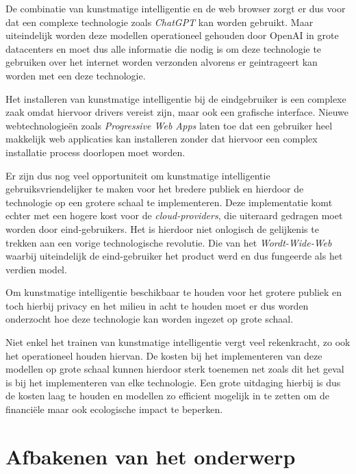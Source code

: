 \bigbreak{}

De combinatie van kunstmatige intelligentie en de web browser zorgt er dus voor dat een complexe technologie zoals \textit{ChatGPT} kan worden gebruikt. Maar uiteindelijk worden deze modellen operationeel gehouden door OpenAI in grote datacenters en moet dus alle informatie die nodig is om deze technologie te gebruiken over het internet worden verzonden alvorens er geintrageert kan worden met een deze technologie.

\bigbreak{}

Het installeren van kunstmatige intelligentie bij de eindgebruiker is een complexe zaak omdat hiervoor drivers vereist zijn, maar ook een grafische interface. Nieuwe webtechnologieën zoals \textit{Progressive Web Apps} laten toe dat een gebruiker heel makkelijk web applicaties kan installeren zonder dat hiervoor een complex installatie process doorlopen moet worden. 

\bigbreak{}

Er zijn dus nog veel opportuniteit om kunstmatige intelligentie gebruiksvriendelijker te maken voor het bredere publiek en hierdoor de technologie op een grotere schaal te implementeren. Deze implementatie komt echter met een hogere kost voor de \textit{cloud-providers}, die uiteraard gedragen moet worden door eind-gebruikers. Het is hierdoor niet onlogisch de gelijkenis te trekken aan een vorige technologische revolutie. Die van het \textit{Wordt-Wide-Web} waarbij uiteindelijk de eind-gebruiker het product werd en dus fungeerde als het verdien model.

\bigbreak{}

Om kunstmatige intelligentie beschikbaar te houden voor het grotere publiek en toch hierbij privacy en het milieu in acht te houden moet er dus worden onderzocht hoe deze technologie kan worden ingezet op grote schaal.

\bigbreak{}

Niet enkel het trainen van kunstmatige intelligentie vergt veel rekenkracht, zo ook het operationeel houden hiervan. De kosten bij het implementeren van deze modellen op grote schaal kunnen hierdoor sterk toenemen net zoals dit het geval is bij het implementeren van elke technologie. Een grote uitdaging hierbij is dus de kosten laag te houden en modellen zo efficient mogelijk in te zetten om de financiële maar ook ecologische impact te beperken.

\section{Afbakenen van het onderwerp} %


